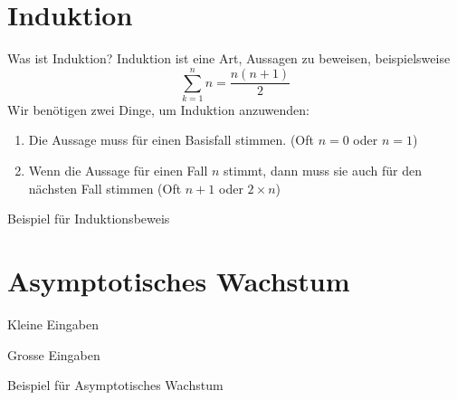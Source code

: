 \documentclass[aspectratio=169]{beamer}
\begin{document}
  \section{Induktion}
  \begin{frame}{Was ist Induktion?}
    Induktion ist eine Art, Aussagen zu beweisen, beispielsweise \[\sum_{k=1}^n n = \frac{n(n+1)}{2}\] Wir benötigen zwei Dinge, um Induktion anzuwenden:
    \begin{enumerate}
      \item Die Aussage muss für einen Basisfall stimmen. (Oft \(n=0\) oder \(n=1\))
      \item Wenn die Aussage für einen Fall \(n\) stimmt, dann muss sie auch für den nächsten Fall stimmen (Oft \(n+1\) oder \(2\times n\))
    \end{enumerate}
  \end{frame}
  \begin{frame}[standout]
    Beispiel für Induktionsbeweis
  \end{frame}
  \section{Asymptotisches Wachstum}
  \begin{frame}{Kleine Eingaben}
    \begin{center}
    \end{center}
  \end{frame}
  \begin{frame}{Grosse Eingaben}
    \begin{center}
    \end{center}
  \end{frame}
  \begin{frame}[standout]
    Beispiel für Asymptotisches Wachstum
  \end{frame}
\end{document}
